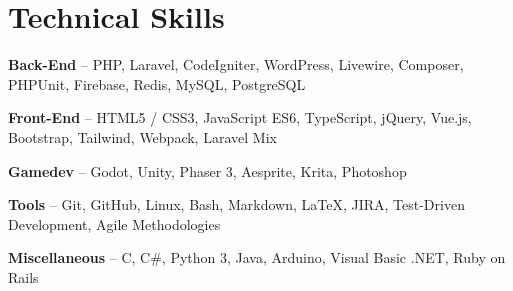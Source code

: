 \section{Technical Skills}
\begin{small}
	\parbox[t][][t]{\linewidth}{
		\textbf{Back-End} -- PHP, Laravel, CodeIgniter, WordPress, Livewire, Composer, PHPUnit, Firebase, Redis, MySQL, PostgreSQL
		\smallbreak
	}
	\parbox[t][][t]{\linewidth}{
		\textbf{Front-End} -- HTML5 / CSS3, JavaScript ES6, TypeScript, jQuery, Vue.js, Bootstrap, Tailwind, Webpack, Laravel Mix
		\smallbreak
	}
	\parbox[t][][t]{\linewidth}{
		\textbf{Gamedev} -- Godot, Unity, Phaser 3, Aesprite, Krita, Photoshop
		\smallbreak
	}
	\parbox[t][][t]{\linewidth}{
		\textbf{Tools} -- Git, GitHub, Linux, Bash, Markdown, LaTeX, JIRA, Test-Driven Development, Agile Methodologies
		\smallbreak
	}
	\parbox[t][][t]{\linewidth}{
		\textbf{Miscellaneous} -- C, C\#, Python 3, Java, Arduino, Visual Basic .NET, Ruby on Rails
	}
\end{small}
